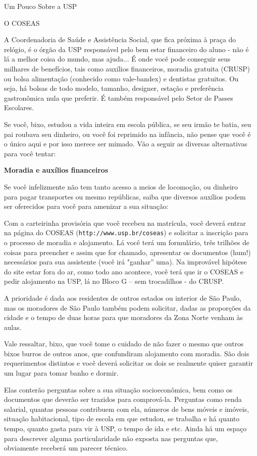 \begin{secao}{Um Pouco Sobre a USP}
\begin{subsecao}{O COSEAS}

A Coordenadoria de Saúde e Assistência Social, que fica próxima à praça do relógio,
é o órgão da USP responsável pelo bem estar financeiro do aluno - não é lá a
melhor coisa do mundo, mas ajuda... É onde você pode conseguir seus milhares de
benefícios, tais como auxílios financeiros, moradia gratuita (CRUSP) ou bolsa
alimentação (conhecido como vale-bandex) e dentistas gratuitos. Ou seja, há
bolsas de todo modelo, tamanho, designer, estação e preferência gastronômica
nula que preferir. É também responsável pelo Setor de Passes Escolares. 

Se você, bixo, estudou a vida inteira em escola pública, se seu irmão te batia,
seu pai roubava seu dinheiro, ou você foi reprimido na infância, não pense que
você é o único aqui e por isso merece ser mimado. Vão a seguir as diversas
alternativas para você tentar:

{\bf Moradia e auxílios financeiros}

Se você infelizmente não tem tanto acesso a meios de locomoção, ou dinheiro para
pagar transportes ou mesmo repúblicas, saiba que diversos auxílios podem ser
oferecidos para você para amenizar a sua situação:

Com a carteirinha provisória que você recebeu na matrícula, você deverá entrar
na página do COSEAS ({\tt http://www.usp.br/coseas}) e solicitar a inscrição
para o processo de moradia e alojamento. Lá você terá um formulário, três
trilhões de coisas para preencher e assim que for chamado, apresentar os
documentos (hum!) necessários para sua assistente (você irá "ganhar” uma). Na
improvável hipótese do site estar fora do ar, como todo ano acontece, você terá
que ir o COSEAS e pedir alojamento na USP, lá no Bloco G – sem trocadilhos - do
CRUSP.

A prioridade é dada aos residentes de outros estados ou interior de São Paulo,
mas os moradores de São Paulo também podem solicitar, dadas as proporções da
cidade e o tempo de duas horas para que moradores da Zona Norte venham às aulas. 

Vale ressaltar, bixo, que você tome o cuidado de não fazer o mesmo que outros
bixos burros de outros anos, que confundiram alojamento com moradia. São dois
requerimentos distintos e você deverá solicitar os dois se realmente quiser
garantir um lugar para tomar banho e dormir.

Elas conterão perguntas sobre a sua situação socioeconômica, bem como os
documentos que deverão ser trazidos para comprová-la. Perguntas como renda
salarial, quantas pessoas contribuem com ela, números de bens móveis e imóveis,
situação habitacional, tipo de escola em que estudou, se trabalha e há quanto
tempo, quanto gasta para vir à USP, o tempo de ida e etc. Ainda há um espaço
para descrever alguma particularidade não exposta nas perguntas que, obviamente
receberá um parecer técnico.


\end{subsecao}
\end{secao}
